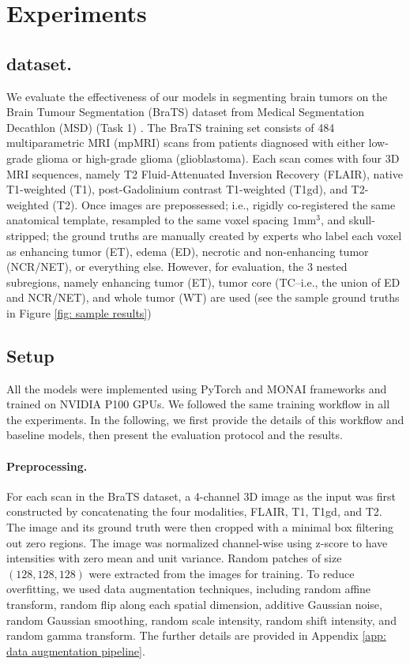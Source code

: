 \documentclass[a4,12pt]{article}
\begin{document}
	
	\section{Experiments} \label{sec: experiments}
	
	
	\subsection{dataset.} 
	
	We evaluate the effectiveness of our models in segmenting brain tumors on the Brain Tumour Segmentation (BraTS) dataset \citep{brats1, brats2, brats3} from Medical Segmentation Decathlon (MSD) (Task 1) \citep{antonelli2021medical}. The BraTS training set consists of 484 multiparametric MRI (mpMRI) scans from patients diagnosed with either low-grade glioma or high-grade glioma (glioblastoma). Each scan comes with four 3D MRI sequences, namely T2 Fluid-Attenuated Inversion Recovery (FLAIR), native T1-weighted (T1), post-Gadolinium contrast T1-weighted (T1gd), and T2-weighted (T2). Once images are prepossessed; i.e., rigidly co-registered the same anatomical template, resampled to the same voxel spacing $ 1 \text{mm}^3 $, and skull-stripped; the ground truths are manually created by experts who label each voxel as enhancing tumor (ET), edema (ED), necrotic and non-enhancing tumor (NCR/NET), or everything else. However, for evaluation, the 3 nested subregions, namely enhancing tumor (ET), tumor core (TC--i.e., the union of ED and NCR/NET), and whole tumor (WT) are used (see the sample ground truths in Figure \ref{fig: sample results})
	
	
	\subsection{Setup} \label{sec: setup}
	
	All the models were implemented using PyTorch \citep{PyTorch2019} and MONAI \citep{monai2021} frameworks and trained on NVIDIA P100 GPUs. We followed the same training workflow in all the experiments. In the following, we first provide the details of this workflow and baseline models, then present the evaluation protocol and the results.
	
	\paragraph{Preprocessing.} 
	For each scan in the BraTS dataset, a 4-channel 3D image as the input was first constructed by concatenating the four modalities, FLAIR, T1, T1gd, and T2. The image and its ground truth were then cropped with a minimal box filtering out zero regions. The image was normalized channel-wise using z-score to have intensities with zero mean and unit variance. Random patches of size $ (128, 128, 128) $ were extracted from the images for training. To reduce overfitting, we used data augmentation techniques, including random affine transform, random flip along each spatial dimension, additive Gaussian noise, random Gaussian smoothing, random scale intensity,  random shift intensity, and random gamma transform. The further details are provided in Appendix \ref{app: data augmentation pipeline}.
	
\end{document}
